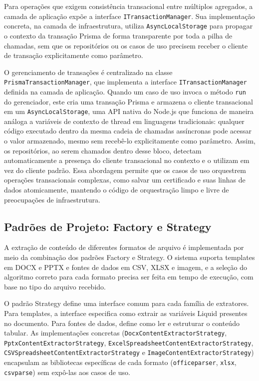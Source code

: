 \documentclass[article,a4paper,12pt,brazil,sumario=tradicional]{abntex2}
\begin{document}
Para operações que exigem consistência transacional entre múltiplos agregados, a camada de aplicação expõe a interface \texttt{ITransactionManager}. Sua implementação concreta, na camada de infraestrutura, utiliza \texttt{AsyncLocalStorage} para propagar o contexto da transação Prisma de forma transparente por toda a pilha de chamadas, sem que os repositórios ou os casos de uso precisem receber o cliente de transação explicitamente como parâmetro.

O gerenciamento de transações é centralizado na classe \texttt{PrismaTransaction\-Manager}, que implementa a interface \texttt{ITransactionManager} definida na camada de aplicação. Quando um caso de uso invoca o método \texttt{run} do gerenciador, este cria uma transação Prisma e armazena o cliente transacional em um \texttt{AsyncLocalStorage}, uma API nativa do Node.js que funciona de maneira análoga a variáveis de contexto de thread em linguagens tradicionais: qualquer código executado dentro da mesma cadeia de chamadas assíncronas pode acessar o valor armazenado, mesmo sem recebê-lo explicitamente como parâmetro. Assim, os repositórios, ao serem chamados dentro desse bloco, detectam automaticamente a presença do cliente transacional no contexto e o utilizam em vez do cliente padrão. Essa abordagem permite que os casos de uso orquestrem operações transacionais complexas, como salvar um certificado e suas linhas de dados atomicamente, mantendo o código de orquestração limpo e livre de preocupações de infraestrutura.

\subsection{Padrões de Projeto: Factory e Strategy}

A extração de conteúdo de diferentes formatos de arquivo é implementada por meio da combinação dos padrões Factory e Strategy. O sistema suporta templates em DOCX e PPTX e fontes de dados em CSV, XLSX e imagem, e a seleção do algoritmo correto para cada formato precisa ser feita em tempo de execução, com base no tipo do arquivo recebido.

O padrão Strategy define uma interface comum para cada família de extratores. Para templates, a interface especifica como extrair as variáveis Liquid presentes no documento. Para fontes de dados, define como ler e estruturar o conteúdo tabular. As implementações concretas (\texttt{DocxContentExtractorStrategy}, \texttt{PptxContent\-ExtractorStrategy}, \texttt{ExcelSpreadsheetContentExtractorStrategy}, \texttt{CSVSpread\-sheetContentExtractorStrategy} e \texttt{ImageContentExtractorStrategy}) encapsulam as bibliotecas específicas de cada formato (\texttt{officeparser}, \texttt{xlsx}, \texttt{csv\-parse}) sem expô-las aos casos de uso.
\end{document}
